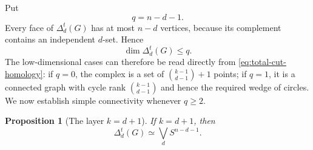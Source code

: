 \documentclass[11pt]{article}
\newtheorem{proposition}[theorem]{Proposition}
\theoremstyle{remark}
\numberwithin{equation}{section}
\begin{document}
Put
\begin{equation}
q=n-d-1.
\label{eq:q}
\end{equation}
Every face of $\Delta_d^t(G)$ has at most $n-d$ vertices, because its
complement contains an independent $d$-set. Hence
\begin{equation}
\dim\Delta_d^t(G)\leq q.
\label{eq:dimension-bound}
\end{equation}
The low-dimensional cases can therefore be read directly from
\eqref{eq:total-cut-homology}: if $q=0$, the complex is a set of
$\binom{k-1}{d-1}+1$ points; if $q=1$, it is a connected graph with cycle rank
$\binom{k-1}{d-1}$ and hence the required wedge of circles. We now establish
simple connectivity whenever $q\geq2$.

\begin{proposition}[The layer $k=d+1$]\label{prop:k-d-plus-one}
If $k=d+1$, then
\begin{equation}
\Delta_d^t(G)\simeq\bigvee_d S^{n-d-1}.
\label{eq:k-d-plus-one}
\end{equation}
\end{proposition}
\end{document}
